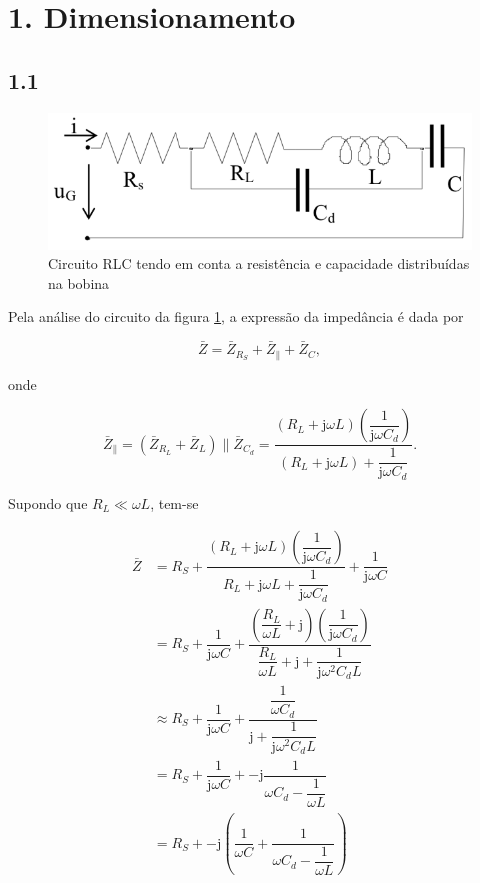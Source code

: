 \documentclass[11pt, a4paper, titlepage, portuguese]{article}
\begin{document}
	\section{1. Dimensionamento}
	\subsection{1.1}
	
		\begin{figure}[h]
			\centering
			\includegraphics[width=0.6\linewidth]{circuito2.png}
			\caption{Circuito RLC tendo em conta a resistência e capacidade distribuídas na bobina}
			\label{circuito2}
		\end{figure}
	
		Pela análise do circuito da figura \ref{circuito2}, a expressão da impedância é dada por
		
		\begin{equation}
			\bar{Z} = \bar{Z}_{R_S} + \bar{Z}_{\parallel} + \bar{Z}_C,
		\end{equation}
		
		onde
		
		\begin{equation}
			\bar{Z}_{\parallel} = (\bar{Z}_{R_L} + \bar{Z}_{L}) \parallel \bar{Z}_{C_d} = \dfrac{\left(R_L + \mathrm{j} \omega L\right)\left(\dfrac{1}{\mathrm{j} \omega C_d}\right)}{(R_L + \mathrm{j} \omega L) + \dfrac{1}{\mathrm{j} \omega C_d}}.
		\end{equation}
		
		Supondo que $R_L \ll \omega L$, tem-se
		
		\begin{align}
			\bar{Z} &= R_S + \dfrac{\left(R_L + \mathrm{j} \omega L\right)\left(\dfrac{1}{\mathrm{j} \omega C_d}\right)}{R_L + \mathrm{j} \omega L + \dfrac{1}{\mathrm{j} \omega C_d}} + \dfrac{1}{\mathrm{j} \omega C} \nonumber \\
			&= R_S + \dfrac{1}{\mathrm{j} \omega C} + \dfrac{\left(\dfrac{R_L}{\omega L} + \mathrm{j}\right)\left(\dfrac{1}{\mathrm{j} \omega C_d}\right)}{\dfrac{R_L}{\omega L} + \mathrm{j} + \dfrac{1}{\mathrm{j} \omega^2 C_d L}} \nonumber \\
			&\approx R_S + \dfrac{1}{\mathrm{j} \omega C} + \dfrac{\dfrac{1}{\omega C_d}}{\mathrm{j} + \dfrac{1}{\mathrm{j} \omega^2 C_d L}} \nonumber \\
			&= R_S + \dfrac{1}{\mathrm{j} \omega C} + -\mathrm{j}\dfrac{1}{\omega C_d - \dfrac{1}{\omega L}} \nonumber \\
			&= R_S + -\mathrm{j}\left(\dfrac{1}{\omega C} + \dfrac{1}{\omega C_d - \dfrac{1}{\omega L}}\right)
		\end{align}
\end{document}
